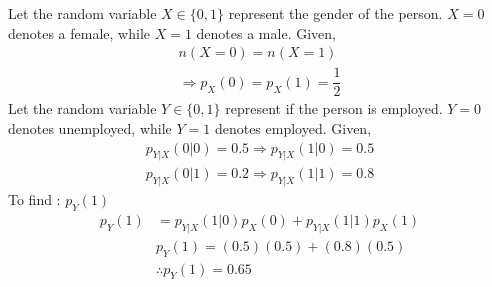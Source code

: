 
Let the random variable $X\in\{0,1\}$ represent the gender of the person. $X=0$ denotes a female, while $X=1$ denotes a male. Given,
\begin{align}
\tag{4.1}
    n(X=0)=n(X=1)\\
\tag{4.2}\Rightarrow p_{X}(0)=p_{X}(1)=\dfrac{1}{2}
\end{align}
Let the random variable $Y\in\{0,1\}$ represent if the person is employed. $Y=0$ denotes unemployed, while $Y=1$ denotes employed. Given, 
\begin{align}
\tag{4.3}
    p_{Y|X}(0|0)=0.5\Rightarrow p_{Y|X}(1|0)=0.5\\
\tag{4.4}
    p_{Y|X}(0|1)=0.2\Rightarrow p_{Y|X}(1|1)=0.8
\end{align}
To find : $p_{Y}(1)$
\begin{align}
\tag{4.5}
p_{Y}(1)&=p_{Y|X}(1|0)p_{X}(0)+p_{Y|X}(1|1)p_{X}(1)\\
\tag{4.6}
&p_{Y}(1)=(0.5)(0.5)+(0.8)(0.5)\\
\tag{4.7}
&\therefore p_{Y}(1)=0.65
\end{align}